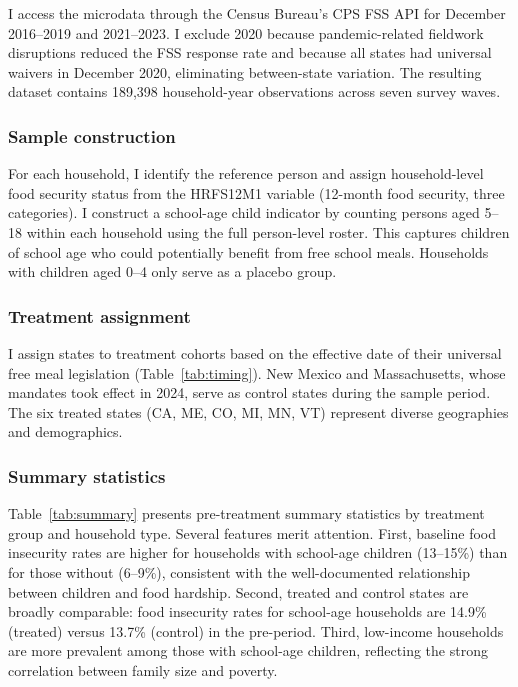 \documentclass[12pt]{article}
\begin{document}
I access the microdata through the Census Bureau's CPS FSS API for December 2016--2019 and 2021--2023. I exclude 2020 because pandemic-related fieldwork disruptions reduced the FSS response rate and because all states had universal waivers in December 2020, eliminating between-state variation. The resulting dataset contains 189,398 household-year observations across seven survey waves.

\subsubsection*{Sample construction} For each household, I identify the reference person and assign household-level food security status from the HRFS12M1 variable (12-month food security, three categories). I construct a school-age child indicator by counting persons aged 5--18 within each household using the full person-level roster. This captures children of school age who could potentially benefit from free school meals. Households with children aged 0--4 only serve as a placebo group.

\subsubsection*{Treatment assignment} I assign states to treatment cohorts based on the effective date of their universal free meal legislation (Table~\ref{tab:timing}). New Mexico and Massachusetts, whose mandates took effect in 2024, serve as control states during the sample period. The six treated states (CA, ME, CO, MI, MN, VT) represent diverse geographies and demographics.

\subsubsection*{Summary statistics} Table~\ref{tab:summary} presents pre-treatment summary statistics by treatment group and household type. Several features merit attention. First, baseline food insecurity rates are higher for households with school-age children (13--15\%) than for those without (6--9\%), consistent with the well-documented relationship between children and food hardship. Second, treated and control states are broadly comparable: food insecurity rates for school-age households are 14.9\% (treated) versus 13.7\% (control) in the pre-period. Third, low-income households are more prevalent among those with school-age children, reflecting the strong correlation between family size and poverty.
\end{document}
